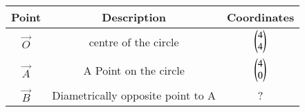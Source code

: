 \begin{tabular}[12pt]{ |c| c| c|}
    \hline
    \textbf{Point} & \textbf{Description}&\textbf{Coordinates}\\ 
    \hline
	$\vec O$ & centre of the circle&$\begin{pmatrix}4\\4\end{pmatrix}$\\
    \hline
	$\vec A$ & A Point on the circle & $\begin{pmatrix}4\\0\end{pmatrix}$\\
    \hline
	$\vec B$ & Diametrically opposite point to A & ? \\ 
    \hline
    \end{tabular}

